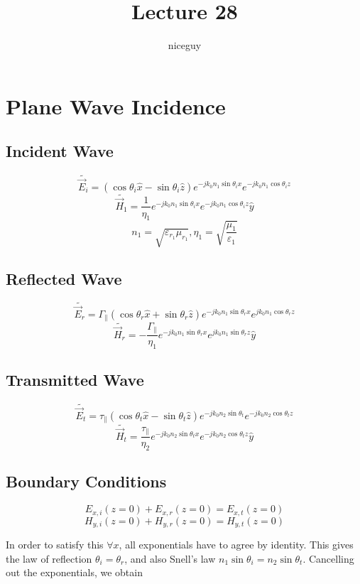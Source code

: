 \documentclass[12pt]{article}
\title{Lecture 28}
\author{niceguy}
\begin{document}
\maketitle

\section{Plane Wave Incidence}

\subsection{Incident Wave}

$$\tilde{\vec E_i} = (\cos\theta_i\hat x - \sin\theta_i\hat z)e^{-jk_0n_1\sin\theta_ix}e^{-jk_0n_1\cos\theta_iz}$$
$$\tilde{\vec H_1} = \frac{1}{\eta_1}e^{-jk_0n_1\sin\theta_ix}e^{-jk_0n_1\cos\theta_iz}\hat y$$
$$n_1 = \sqrt{\varepsilon_{r_1}\mu_{r_1}}, \eta_1 = \sqrt{\frac{\mu_1}{\varepsilon_1}}$$

\subsection{Reflected Wave}

$$\tilde{\vec E_r} = \Gamma_\parallel (\cos\theta_r\hat x + \sin\theta_r\hat z)e^{-jk_0n_1\sin\theta_rx}e^{jk_0n_1\cos\theta_rz}$$
$$\tilde{\vec H_r} = -\frac{\Gamma_\parallel}{\eta_1}e^{-jk_0n_1\sin\theta_rx}e^{jk_0n_1\sin\theta_rz}\hat y$$

\subsection{Transmitted Wave}

$$\tilde{\vec E_t} = \tau_\parallel(\cos\theta_t\hat x - \sin\theta_t\hat z)e^{-jk_0n_2\sin\theta_t}e^{-jk_0n_2\cos\theta_tz}$$
$$\tilde{\vec H_t} = \frac{\tau_\parallel}{\eta_2}e^{-jk_0n_2\sin\theta_tx}e^{-jk_0n_2\cos\theta_tz}\hat y$$

\subsection{Boundary Conditions}

$$E_{x,i}(z=0) + E_{x,r}(z=0) = E_{x,t}(z=0)$$
$$H_{y,i}(z=0) + H_{y,r}(z=0) = H_{y,t}(z=0)$$

In order to satisfy this $\forall x$, all exponentials have to agree by identity. This gives the law of reflection $\theta_i = \theta_r$, and also Snell's law $n_1\sin\theta_i = n_2\sin\theta_t$. Cancelling out the exponentials, we obtain
\end{document}
